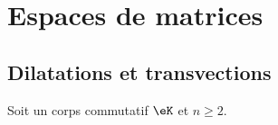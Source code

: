 \section{Espaces de matrices}

\subsection{Dilatations et transvections}

Soit un corps commutatif \( \eK\) et \( n\geq 2\).

